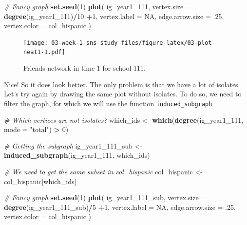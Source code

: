 \documentclass[]{book}
\newenvironment{Shaded}{\begin{snugshade}}{\end{snugshade}}
\newcommand{\CommentTok}[1]{\textcolor[rgb]{0.56,0.35,0.01}{\textit{#1}}}
\newcommand{\DataTypeTok}[1]{\textcolor[rgb]{0.13,0.29,0.53}{#1}}
\newcommand{\DecValTok}[1]{\textcolor[rgb]{0.00,0.00,0.81}{#1}}
\newcommand{\FloatTok}[1]{\textcolor[rgb]{0.00,0.00,0.81}{#1}}
\newcommand{\KeywordTok}[1]{\textcolor[rgb]{0.13,0.29,0.53}{\textbf{#1}}}
\newcommand{\NormalTok}[1]{#1}
\newcommand{\OperatorTok}[1]{\textcolor[rgb]{0.81,0.36,0.00}{\textbf{#1}}}
\newcommand{\OtherTok}[1]{\textcolor[rgb]{0.56,0.35,0.01}{#1}}
\newcommand{\StringTok}[1]{\textcolor[rgb]{0.31,0.60,0.02}{#1}}
\begin{document}
\begin{Shaded}
\begin{Highlighting}[]
\CommentTok{# Fancy graph}
\KeywordTok{set.seed}\NormalTok{(}\DecValTok{1}\NormalTok{)}
\KeywordTok{plot}\NormalTok{(}
\NormalTok{  ig_year1_}\DecValTok{111}\NormalTok{,}
  \DataTypeTok{vertex.size     =} \KeywordTok{degree}\NormalTok{(ig_year1_}\DecValTok{111}\NormalTok{)}\OperatorTok{/}\DecValTok{10} \OperatorTok{+}\DecValTok{1}\NormalTok{,}
  \DataTypeTok{vertex.label    =} \OtherTok{NA}\NormalTok{,}
  \DataTypeTok{edge.arrow.size =} \FloatTok{.25}\NormalTok{,}
  \DataTypeTok{vertex.color    =}\NormalTok{ col_hispanic}
\NormalTok{  )}
\end{Highlighting}
\end{Shaded}

\begin{figure}
\centering
\texttt{[image: 03-week-1-sns-study\_files/figure-latex/03-plot-neat1-1.pdf]}
\caption{\label{fig:03-plot-neat1}Friends network in time 1 for school 111.}
\end{figure}

Nice! So it does look better. The only problem is that we have a lot of isolates. Let's try again by drawing the same plot without isolates. To do so, we need to filter the graph, for which we will use the function \texttt{induced\_subgraph}

\begin{Shaded}
\begin{Highlighting}[]
\CommentTok{# Which vertices are not isolates?}
\NormalTok{which_ids <-}\StringTok{ }\KeywordTok{which}\NormalTok{(}\KeywordTok{degree}\NormalTok{(ig_year1_}\DecValTok{111}\NormalTok{, }\DataTypeTok{mode =} \StringTok{"total"}\NormalTok{) }\OperatorTok{>}\StringTok{ }\DecValTok{0}\NormalTok{)}

\CommentTok{# Getting the subgraph}
\NormalTok{ig_year1_}\DecValTok{111}\NormalTok{_sub <-}\StringTok{ }\KeywordTok{induced_subgraph}\NormalTok{(ig_year1_}\DecValTok{111}\NormalTok{, which_ids)}

\CommentTok{# We need to get the same subset in col_hispanic}
\NormalTok{col_hispanic <-}\StringTok{ }\NormalTok{col_hispanic[which_ids]}
\end{Highlighting}
\end{Shaded}

\begin{Shaded}
\begin{Highlighting}[]
\CommentTok{# Fancy graph}
\KeywordTok{set.seed}\NormalTok{(}\DecValTok{1}\NormalTok{)}
\KeywordTok{plot}\NormalTok{(}
\NormalTok{  ig_year1_}\DecValTok{111}\NormalTok{_sub,}
  \DataTypeTok{vertex.size     =} \KeywordTok{degree}\NormalTok{(ig_year1_}\DecValTok{111}\NormalTok{_sub)}\OperatorTok{/}\DecValTok{5} \OperatorTok{+}\DecValTok{1}\NormalTok{,}
  \DataTypeTok{vertex.label    =} \OtherTok{NA}\NormalTok{,}
  \DataTypeTok{edge.arrow.size =} \FloatTok{.25}\NormalTok{,}
  \DataTypeTok{vertex.color    =}\NormalTok{ col_hispanic}
\NormalTok{  )}
\end{Highlighting}
\end{Shaded}
\end{document}
